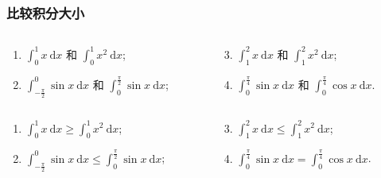 \documentclass[
10pt,
aspectratio=43,
]{beamer}
\begin{document}
\begin{frame}
	\frametitle{比较积分大小}
	\everymath{\displaystyle}
	\begin{block}{}
		\begin{columns}
			\begin{column}{0.5\textwidth}
				\begin{enumerate}
					\item $\int_0^1 x \mathrm{~d} x$ 和 $\int_0^1 x^2 \mathrm{~d} x$;
					\item	$\int_{-\frac{\pi}{2}}^0 \sin x \mathrm{~d} x$ 和 $\int_0^{\frac{\pi}{2}} \sin x \mathrm{~d} x$;
				\end{enumerate}
			\end{column}
			\begin{column}{0.5\textwidth}
				\begin{enumerate}
					\setcounter{enumi}{2}
					\item $\int_1^2 x \mathrm{~d} x$ 和 $\int_1^2 x^2 \mathrm{~d} x$;
					\item $\int_0^{\frac{\pi}{4}} \sin x \mathrm{~d} x$ 和 $\int_0^{\frac{\pi}{4}} \cos x \mathrm{~d} x$.
				\end{enumerate}
			\end{column}
		\end{columns}
	\end{block}
	\pause
	\begin{exampleblock}{}
		\begin{columns}
			\begin{column}{0.5\textwidth}
				\begin{enumerate}
					\item<1-> $\int_0^1 x \mathrm{~d} x\ge\int_0^1 x^2 \mathrm{~d} x$;
					\item<2-> $\int_{-\frac{\pi}{2}}^0 \sin x \mathrm{~d} x\le\int_0^{\frac{\pi}{2}} \sin x \mathrm{~d} x$;
				\end{enumerate}
			\end{column}
			\begin{column}{0.5\textwidth}
				\begin{enumerate}
					\setcounter{enumi}{2}
					\item<3-> $\int_1^2 x \mathrm{~d} x\le\int_1^2 x^2 \mathrm{~d} x$;
					\item<4-> $\int_0^{\frac{\pi}{4}} \sin x \mathrm{~d} x=\int_0^{\frac{\pi}{4}} \cos x \mathrm{~d} x$.
				\end{enumerate}
			\end{column}
		\end{columns}
	\end{exampleblock}
\end{frame}
\end{document}
